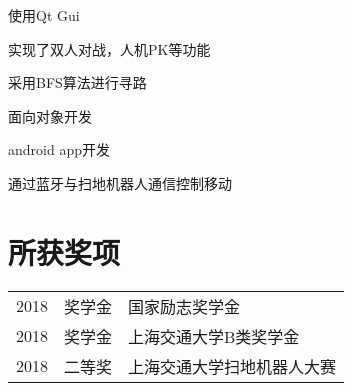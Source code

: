 \documentclass[]{deedy-resume-openfont}
\begin{document}
\begin{minipage}[t]{0.73\textwidth}
\begin{tightemize}
\item 使用Qt Gui
\item 实现了双人对战，人机PK等功能
\item 采用BFS算法进行寻路
\item 面向对象开发
\end{tightemize}
\sectionsep
\sectionsep

\begin{tightemize}
\item android app开发
\item 通过蓝牙与扫地机器人通信控制移动
\end{tightemize}
\sectionsep
\sectionsep




\section{所获奖项} 
\begin{tabular}{rll}
2018         & 奖学金  & 国家励志奖学金 \\
2018	     & 奖学金  & 上海交通大学B类奖学金 \\
2018	     & 二等奖  & 上海交通大学扫地机器人大赛 \\
\end{tabular}
\sectionsep


% 
% 

\end{minipage} 
\end{document}
